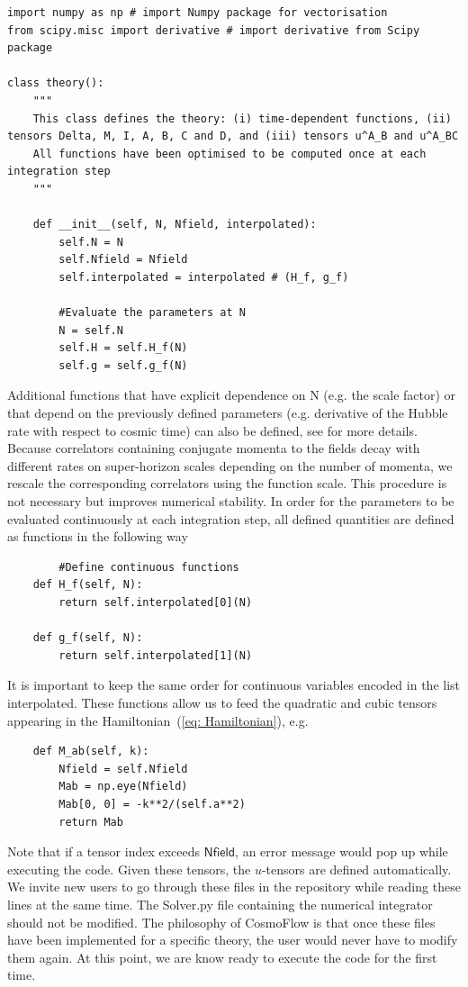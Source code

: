 \documentclass[11pt]{article}
\numberwithin{equation}{section} %
\begin{document}
\begin{lstlisting}
import numpy as np # import Numpy package for vectorisation
from scipy.misc import derivative # import derivative from Scipy package

class theory():
	"""
	This class defines the theory: (i) time-dependent functions, (ii) tensors Delta, M, I, A, B, C and D, and (iii) tensors u^A_B and u^A_BC
	All functions have been optimised to be computed once at each integration step
	"""

	def __init__(self, N, Nfield, interpolated):
		self.N = N
		self.Nfield = Nfield
		self.interpolated = interpolated # (H_f, g_f)

		#Evaluate the parameters at N
		N = self.N
		self.H = self.H_f(N)
		self.g = self.g_f(N)
\end{lstlisting}
Additional functions that have explicit dependence on \textsf{N} (e.g. the scale factor) or that depend on the previously defined parameters (e.g. derivative of the Hubble rate with respect to cosmic time) can also be defined, see \href{https://github.com/deniswerth/CosmoFlow/blob/main/CosmoFlow/Massless_dphi3/Theory.py}{\faGithub} for more details. Because correlators containing conjugate momenta to the fields decay with different rates on super-horizon scales depending on the number of momenta, we rescale the corresponding correlators using the function \textsf{scale}. This procedure is not necessary but improves numerical stability. In order for the parameters to be evaluated continuously at each integration step, all defined quantities are defined as functions in the following way

\begin{lstlisting}
        #Define continuous functions
	def H_f(self, N):
		return self.interpolated[0](N)

	def g_f(self, N):
		return self.interpolated[1](N)
\end{lstlisting}
It is important to keep the same order for continuous variables encoded in the list \textsf{interpolated}. These functions allow us to feed the quadratic and cubic tensors appearing in the Hamiltonian~(\ref{eq: Hamiltonian}), e.g.

\begin{lstlisting}
	def M_ab(self, k):
		Nfield = self.Nfield
		Mab = np.eye(Nfield)
		Mab[0, 0] = -k**2/(self.a**2)
		return Mab
\end{lstlisting}
Note that if a tensor index exceeds $\textsf{Nfield}$, an error message would pop up while executing the code. Given these tensors, the $u$-tensors are defined automatically. We invite new users to go through these files in the repository while reading these lines at the same time. The \textsf{Solver.py} file containing the numerical integrator should not be modified. The philosophy of \textsf{CosmoFlow} is that once these files have been implemented for a specific theory, the user would never have to modify them again. At this point, we are know ready to execute the code for the first time.
\end{document}
